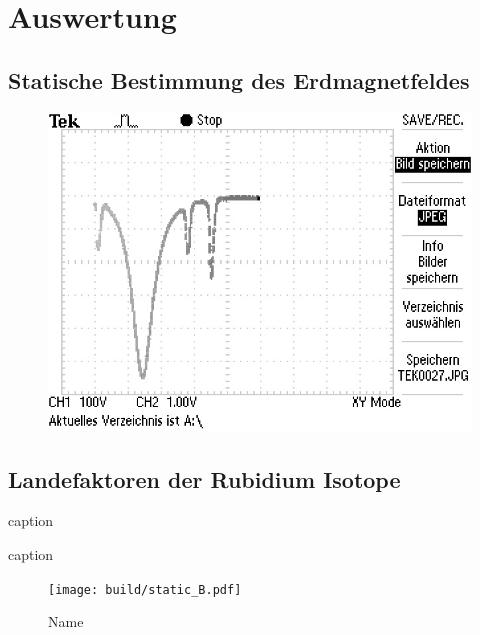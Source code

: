 \section{Auswertung}%
\label{sec:auswertung}

\subsection{Statische Bestimmung des Erdmagnetfeldes}%
\label{sub:statische_bestimmung_des_erdmagnetfeldes}

\begin{figure}[h]
	\centering
	\includegraphics[width=0.8\linewidth]{picture/Transmission_Spek.JPG}
	\caption{}
	\label{fig:}
\end{figure}


\subsection{Landefaktoren der Rubidium Isotope}%
\label{sub:landefaktoren_der_rubidium_isotope}


\begin{table}[h]
	\centering
	\caption{caption}
	\label{tab:label}
		
\end{table}

\begin{table}[h]
	\centering
	\caption{caption}
	\label{tab:label}
	
\end{table}

\begin{figure}[h]
	\centering
	\texttt{[image: build/static\_B.pdf]}
	\caption{Name}
	\label{fig:name}
\end{figure}


